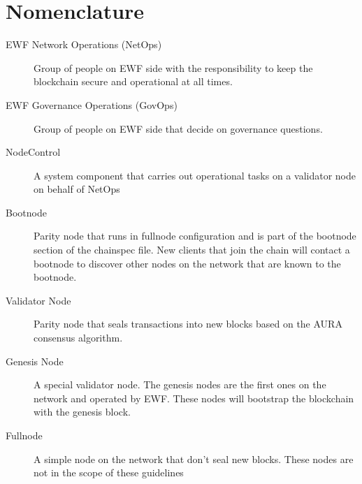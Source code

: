 \section{Nomenclature}

\begin{description}
    \item[EWF Network Operations (NetOps)] 
        Group of people on EWF side with the responsibility to keep the blockchain secure and operational at all times.
    \item[EWF Governance Operations (GovOps)] 
        Group of people on EWF side that decide on governance questions.
    \item[NodeControl] 
        A system component that carries out operational tasks on a validator node on behalf of NetOps
    \item[Bootnode] 
        Parity node that runs in fullnode configuration and is part of the bootnode section of the chainspec file.
        New clients that join the chain will contact a bootnode to discover other nodes on the network that are known to the bootnode.
    \item[Validator Node]
        Parity node that seals transactions into new blocks based on the AURA consensus algorithm.
    \item[Genesis Node]
        A special validator node. The genesis nodes are the first ones on the network and operated by EWF. These nodes will bootstrap the blockchain with the genesis block.
    \item[Fullnode]
        A simple node on the network that don't seal new blocks. These nodes are not in the scope of these guidelines

\end{description}
